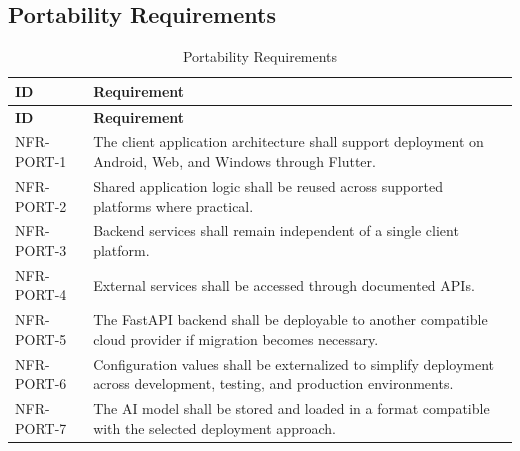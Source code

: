 \subsection{Portability Requirements}
\begin{longtable}{@{}p{2.6cm}p{10.8cm}@{}}
\caption{Portability Requirements} \label{tab:nfr-port} \\
\toprule \textbf{ID} & \textbf{Requirement} \\ \midrule
\endfirsthead
\toprule \textbf{ID} & \textbf{Requirement} \\ \midrule
\endhead
NFR-PORT-1 & The client application architecture shall support deployment on Android, Web, and Windows through Flutter. \\
NFR-PORT-2 & Shared application logic shall be reused across supported platforms where practical. \\
NFR-PORT-3 & Backend services shall remain independent of a single client platform. \\
NFR-PORT-4 & External services shall be accessed through documented APIs. \\
NFR-PORT-5 & The FastAPI backend shall be deployable to another compatible cloud provider if migration becomes necessary. \\
NFR-PORT-6 & Configuration values shall be externalized to simplify deployment across development, testing, and production environments. \\
NFR-PORT-7 & The AI model shall be stored and loaded in a format compatible with the selected deployment approach. \\
\bottomrule
\end{longtable}

